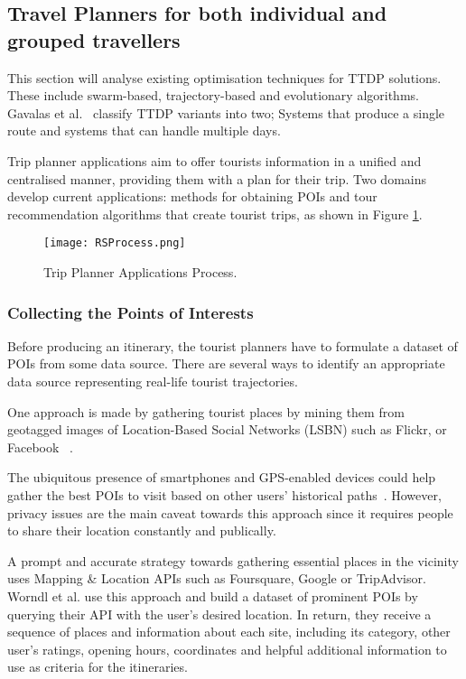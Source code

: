 \subsection{Travel Planners for both individual and grouped travellers}

This section will analyse existing optimisation
techniques for TTDP solutions. These include
swarm-based, trajectory-based and evolutionary
algorithms. Gavalas et al.~\cite{Gavalas2014a}
classify TTDP variants into two; Systems that produce
a single route and systems that can handle multiple
days. 

Trip planner applications aim to offer tourists
information in a unified and centralised manner,
providing them with a plan for their trip. Two domains
develop current applications: methods for obtaining
POIs and tour recommendation algorithms that create
tourist trips, as shown in Figure \ref{RS}.

\begin{figure}[h]
\centering
\texttt{[image: RSProcess.png]}
\caption{Trip Planner Applications Process.}
\label{RS}
\end{figure}

\subsubsection{Collecting the Points of Interests}

Before producing an itinerary, the tourist planners have to
formulate a dataset of POIs from some data source. There are
several ways to identify an appropriate data source representing
real-life tourist trajectories. 

One approach is made by gathering tourist places by mining them from
geotagged images of Location-Based Social Networks (LSBN) such as Flickr,
or Facebook ~\cite{DeChoudhury2010, Memon2015, Lucchese2012, Lim2018a,
HuiLim, HuiLima, Kurashima2013, Kurashima2010, Brilhante2013, Brilhante2015 }.

The ubiquitous presence of smartphones and GPS-enabled devices
could help gather the best POIs to visit based on other users'
historical paths~\cite{10.1145/1889681.1889683,
10.1145/1526709.1526816, Chen2011a}. However, privacy issues are the main caveat
towards this approach since it requires people to share their
location constantly and publically\cite{Lim2018}.

A prompt and accurate strategy towards gathering essential places
in the vicinity uses Mapping \& Location APIs such as Foursquare,
Google or TripAdvisor. Worndl et al.\cite{Worndl2017} use this approach and build a
dataset of prominent POIs by querying their API with the user's
desired location. In return, they receive a sequence of places and
information about each site, including its category, other user's
ratings, opening hours, coordinates and helpful additional
information to use as criteria for the itineraries.


